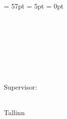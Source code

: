 
\begin{titlepage}
\headheight = 57pt
\footskip = 5pt
\headsep = 0pt

\centering
\university\\
\school

\vspace*{4.5 cm}

\begin{center}

\authorName~~\studentcode\\
\vspace*{1.5 cm}

\begin{Large}
\textsc{\textbf{\doctitle}}\\
\end{Large}

\vspace*{1.5 cm}
\doctype\\
\end{center}

\vspace*{0.6 cm}

\begin{flushright}
Supervisor: \supervisor\\\supervisortitle\\
\vspace*{0.2 cm}

\end{flushright}
\vfill

Tallinn \Year
\end{titlepage}

\pagebreak

